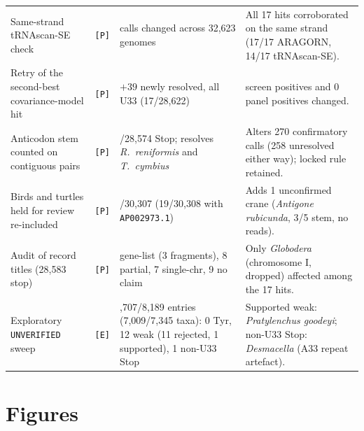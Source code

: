 \documentclass[11pt, a4paper]{article}
\begin{document}
\begin{table}[htbp]
\begin{tabularx}{\textwidth}{
  >{\raggedright\arraybackslash}p{4.0cm}
  c
  >{\raggedright\arraybackslash}p{4.3cm}
  >{\raggedright\arraybackslash}X
}
Same-strand tRNAscan-SE check & \texttt{[P]} & 0 calls changed across 32,623 genomes & All 17 hits corroborated on the same strand (17/17 ARAGORN, 14/17 tRNAscan-SE). \\
Retry of the second-best covariance-model hit & \texttt{[P]} & $+39$ newly resolved, all U33 (17/28,622) & 0 screen positives and 0 panel positives changed. \\
Anticodon stem counted on contiguous pairs & \texttt{[P]} & 17/28,574 Stop; resolves \textit{R.\ reniformis} and \textit{T.\ cymbius} & Alters 270 confirmatory calls (258 unresolved either way); locked rule retained. \\
Birds and turtles held for review re-included & \texttt{[P]} & 18/30,307 (19/30,308 with \texttt{AP002973.1}) & Adds 1 unconfirmed crane (\textit{Antigone rubicunda}, 3/5 stem, no reads). \\
Audit of record titles (28,583 stop) & \texttt{[P]} & 26 gene-list (3 fragments), 8 partial, 7 single-chr, 9 no claim & Only \textit{Globodera} (chromosome I, dropped) affected among the 17 hits. \\
Exploratory \texttt{UNVERIFIED} sweep & \texttt{[E]} & 7,707/8,189 entries (7,009/7,345 taxa): 0 Tyr, 12 weak (11 rejected, 1 supported), 1 non-U33 Stop & Supported weak: \textit{Pratylenchus goodeyi}; non-U33 Stop: \textit{Desmacella} (A33 repeat artefact). \\
\bottomrule
\end{tabularx}
\end{table}

\clearpage
\section*{Figures}
\end{document}
